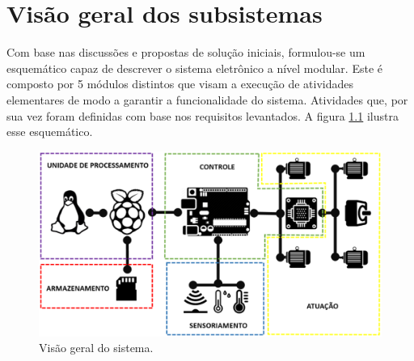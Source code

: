 \chapter{Visão geral dos subsistemas}

%
%

Com base nas discussões e propostas de solução iniciais,
formulou-se um esquemático capaz de descrever o sistema
eletrônico a nível modular. Este é composto por 5 módulos
distintos que visam a execução de atividades elementares
de modo a garantir a funcionalidade do sistema.
Atividades que, por sua vez foram definidas com base nos
requisitos levantados. A figura \ref{fig:visao_geral} ilustra esse esquemático.

\begin{figure}[!htbp]
\begin{center}
\includegraphics[width=.8\textwidth]{figuras/visao_geral.eps}
\caption{\label{fig:visao_geral}Visão geral do sistema.}
\end{center}
\end{figure}

